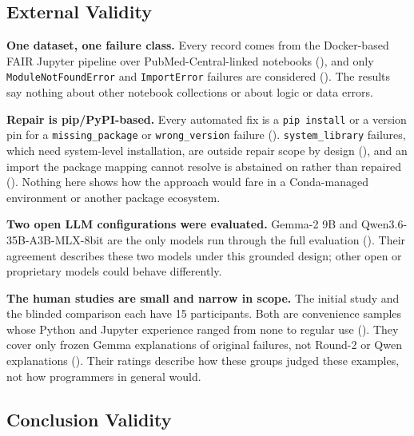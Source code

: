 \subsection{External Validity}
\label{sec:v-threats-external}

\begin{itemize}
\begin{sloppypar}
  \item \textbf{One dataset, one failure class.} Every record comes from
    the Docker-based FAIR Jupyter pipeline over PubMed-Central-linked
    notebooks (), and only
    \texttt{ModuleNotFoundError} and \texttt{ImportError} failures are
    considered (). The results say nothing about other
    notebook collections or about logic or data errors.
  \item \textbf{Repair is pip/PyPI-based.} Every automated fix is a
    \texttt{pip install} or a version pin for a \texttt{missing\_package}
    or \texttt{wrong\_version} failure ().
    \texttt{system\_library} failures, which need system-level
    installation, are outside repair scope by design (),
    and an import the package mapping cannot resolve is abstained on rather
    than repaired (). Nothing here shows how
    the approach would fare in a Conda-managed environment or another
    package ecosystem.
  \item \textbf{Two open LLM configurations were evaluated.} Gemma-2 9B and
    Qwen3.6-35B-A3B-MLX-8bit are the only models run through the full
    evaluation (). Their agreement describes
    these two models under this grounded design; other open or proprietary
    models could behave differently.
  \item \textbf{The human studies are small and narrow in scope.} The initial
    study and the blinded comparison each have 15 participants. Both are
    convenience samples whose Python and Jupyter experience ranged from none
    to regular use ().
    They cover only frozen Gemma explanations of original failures, not
    Round-2 or Qwen explanations (). Their
    ratings describe how these groups judged these examples, not how
    programmers in general would.
\end{sloppypar}
\end{itemize}

\subsection{Conclusion Validity}
\label{sec:v-threats-conclusion}

